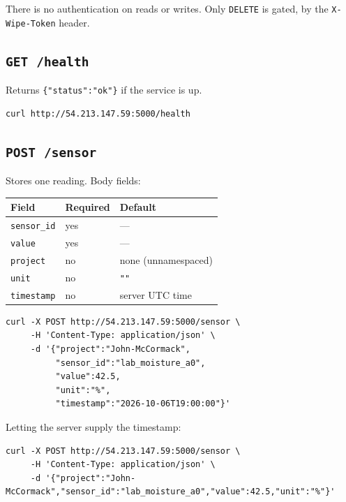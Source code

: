 \documentclass[11pt,a4paper]{article}
\newcommand{\http}[2]{\texttt{\textbf{#1}}~\texttt{#2}}
\begin{document}
\noindent There is no authentication on reads or writes. Only
\texttt{DELETE} is gated, by the \texttt{X-Wipe-Token} header.

\subsection{\http{GET}{/health}}

Returns \texttt{\{"status":"ok"\}} if the service is up.

\begin{lstlisting}
curl http://54.213.147.59:5000/health
\end{lstlisting}

\subsection{\http{POST}{/sensor}}

Stores one reading. Body fields:

\begin{center}
\begin{tabular}{@{}lll@{}}
\toprule
Field & Required & Default \\
\midrule
\texttt{sensor\_id} & yes & --- \\
\texttt{value}      & yes & --- \\
\texttt{project}    & no  & none (unnamespaced) \\
\texttt{unit}       & no  & \texttt{""} \\
\texttt{timestamp}  & no  & server UTC time \\
\bottomrule
\end{tabular}
\end{center}

\begin{lstlisting}
curl -X POST http://54.213.147.59:5000/sensor \
     -H 'Content-Type: application/json' \
     -d '{"project":"John-McCormack",
          "sensor_id":"lab_moisture_a0",
          "value":42.5,
          "unit":"%",
          "timestamp":"2026-10-06T19:00:00"}'
\end{lstlisting}

\noindent Letting the server supply the timestamp:

\begin{lstlisting}
curl -X POST http://54.213.147.59:5000/sensor \
     -H 'Content-Type: application/json' \
     -d '{"project":"John-McCormack","sensor_id":"lab_moisture_a0","value":42.5,"unit":"%"}'
\end{lstlisting}
\end{document}

